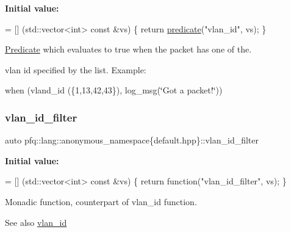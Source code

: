 {\bfseries Initial value\+:}
\begin{DoxyCode}
= [] (std::vector<int> \textcolor{keyword}{const} &vs) \{
                                    \textcolor{keywordflow}{return} \hyperlink{namespacepfq_1_1lang_aca9adafc436b7f851621b979fa1aaf88}{predicate}(\textcolor{stringliteral}{"vlan\_id"}, vs);
                                \}
\end{DoxyCode}


\hyperlink{structpfq_1_1lang_1_1Predicate}{Predicate} which evaluates to {\ttfamily true} when the packet has one of the. 

vlan id specified by the list. Example\+:

when (vland\+\_\+id (\{1,13,42,43\}), log\+\_\+msg(\char`\"{}\+Got a packet!\char`\"{})) \mbox{\label{namespacepfq_1_1lang_1_1anonymous__namespace_02default_8hpp_03_ab843ad210e98a7c8a4218efaf60f8c01}} 
\subsubsection{\texorpdfstring{vlan\+\_\+id\+\_\+filter}{vlan\_id\_filter}}
{\footnotesize\ttfamily auto pfq\+::lang\+::anonymous\+\_\+namespace\{default.\+hpp\}\+::vlan\+\_\+id\+\_\+filter}

{\bfseries Initial value\+:}
\begin{DoxyCode}
= [] (std::vector<int> \textcolor{keyword}{const} &vs) \{
                                    \textcolor{keywordflow}{return} \textcolor{keyword}{function}(\textcolor{stringliteral}{"vlan\_id\_filter"}, vs);
                              \}
\end{DoxyCode}


Monadic function, counterpart of {\ttfamily vlan\+\_\+id} function. 

\begin{DoxySeeAlso}{See also}
\hyperlink{namespacepfq_1_1lang_1_1anonymous__namespace_02default_8hpp_03_ad2a631020f34bf10335ebb0e79f03920}{vlan\+\_\+id} 
\end{DoxySeeAlso}
\mbox{\label{namespacepfq_1_1lang_1_1anonymous__namespace_02default_8hpp_03_a814df3093ef905eedf9a9add4c625147}} 
